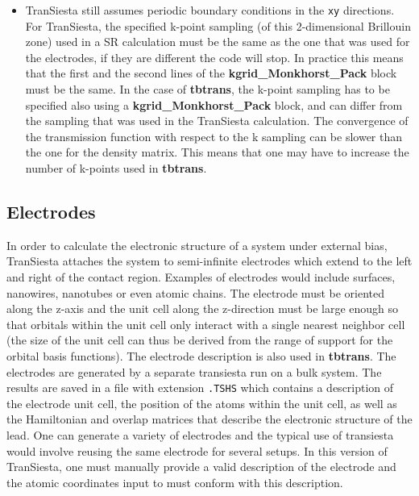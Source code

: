 \documentclass[11pt]{article}
\begin{document}
\begin{itemize}
\item
{\sc TranSiesta} still assumes periodic boundary conditions in the
{\tt xy} directions.  For {\sc TranSiesta}, the specified k-point
sampling (of this 2-dimensional Brillouin zone) used in a SR
calculation must be the same as the one that was used for the
electrodes, if they are different the code will stop. In practice this
means that the first and the second lines of the {\bf
  kgrid\_Monkhorst\_Pack} block must be the same.  In the case of {\bf
  tbtrans}, the k-point sampling has to be specified also using a {\bf
  kgrid\_Monkhorst\_Pack} block, and can differ from the sampling that
was used in the {\sc TranSiesta} calculation. The convergence of the
transmission function with respect to the k sampling can be slower
than the one for the density matrix. This means that one may have to
increase the number of k-points used in {\bf tbtrans}.
\end{itemize}

\subsection{Electrodes}

In order to calculate the electronic structure of a system under
external bias, {\sc TranSiesta} attaches the system to semi-infinite
electrodes which extend to the left and right of the contact
region. Examples of electrodes would include surfaces, nanowires,
nanotubes or even atomic chains. The electrode must be oriented along
the z-axis and the unit cell along the z-direction must be large
enough so that orbitals within the unit cell only interact with a
single nearest neighbor cell (the size of the unit cell can thus be
derived from the range of support for the orbital basis
functions). The electrode description is also used in {\bf tbtrans}.
The electrodes are generated by a separate transiesta run on a bulk
system.  The results are saved in a file with extension {\tt .TSHS}
which contains a description of the electrode unit cell, the position
of the atoms within the unit cell, as well as the Hamiltonian and
overlap matrices that describe the electronic structure of the
lead. One can generate a variety of electrodes and the typical use of
transiesta would involve reusing the same electrode for several
setups.  In this version of {\sc TranSiesta}, one must manually
provide a valid description of the electrode and the atomic
coordinates input to must conform with this description.
\end{document}
